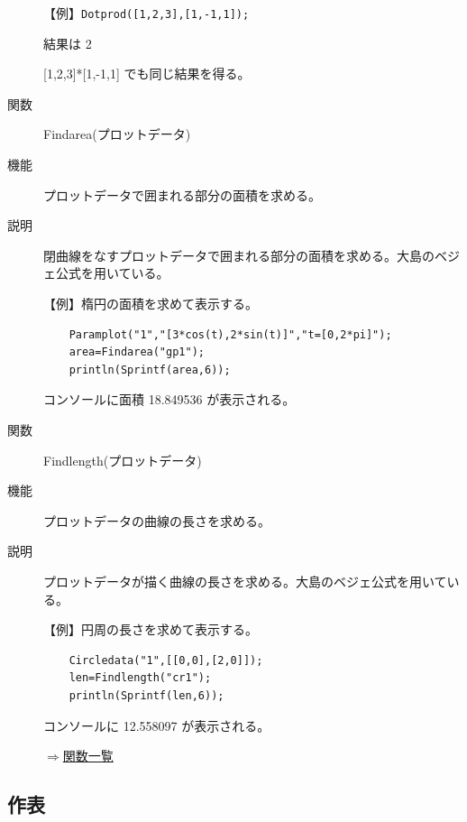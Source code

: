 \documentclass[papersize,a4paper,12pt,uplatex]{jsarticle}
\begin{document}
\begin{description}
\vspace{\baselineskip}
  【例】\verb|Dotprod([1,2,3],[1,-1,1]);|
  
      結果は  2
      
      [1,2,3]*[1,-1,1] でも同じ結果を得る。

\vspace{\baselineskip}
\hypertarget{findarea}{}
\item[関数]  Findarea(プロットデータ)
\item[機能]  プロットデータで囲まれる部分の面積を求める。
\item[説明]  閉曲線をなすプロットデータで囲まれる部分の面積を求める。大島のベジェ公式を用いている。

\vspace{\baselineskip}
【例】楕円の面積を求めて表示する。
\begin{verbatim}
    Paramplot("1","[3*cos(t),2*sin(t)]","t=[0,2*pi]");
    area=Findarea("gp1");
    println(Sprintf(area,6));
\end{verbatim}

コンソールに面積 18.849536 が表示される。 

\vspace{\baselineskip}
\hypertarget{findlength}{}
\item[関数]  Findlength(プロットデータ)
\item[機能]  プロットデータの曲線の長さを求める。
\item[説明]  プロットデータが描く曲線の長さを求める。大島のベジェ公式を用いている。

\vspace{\baselineskip}
【例】円周の長さを求めて表示する。
\begin{verbatim}
    Circledata("1",[[0,0],[2,0]]);
    len=Findlength("cr1");
    println(Sprintf(len,6)); 
\end{verbatim}

コンソールに 12.558097 が表示される。

\begin{flushright}  \hyperlink{functionlist}{$\Rightarrow$関数一覧}\end{flushright}

\end{description}
\newpage
\subsection{作表}
\end{document}
